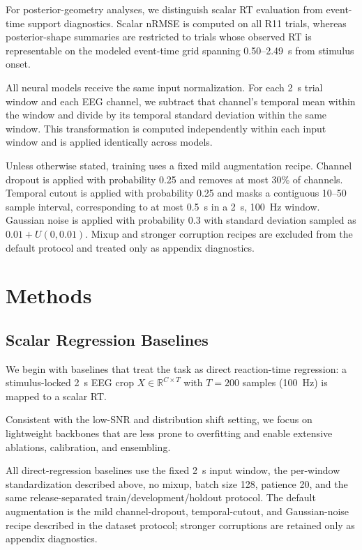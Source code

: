 \documentclass[12pt]{article}
\begin{document}
For posterior-geometry analyses, we distinguish scalar RT evaluation from event-time support diagnostics. Scalar nRMSE is computed on all R11 trials, whereas posterior-shape summaries are restricted to trials whose observed RT is representable on the modeled event-time grid spanning 0.50--2.49~s from stimulus onset.

All neural models receive the same input normalization. For each 2~s trial window and each EEG channel, we subtract that channel's temporal mean within the window and divide by its temporal standard deviation within the same window. This transformation is computed independently within each input window and is applied identically across models.

Unless otherwise stated, training uses a fixed mild augmentation recipe. Channel dropout is applied with probability 0.25 and removes at most 30\% of channels. Temporal cutout is applied with probability 0.25 and masks a contiguous 10--50 sample interval, corresponding to at most 0.5~s in a 2~s, 100~Hz window. Gaussian noise is applied with probability 0.3 with standard deviation sampled as $0.01 + U(0,0.01)$. Mixup and stronger corruption recipes are excluded from the default protocol and treated only as appendix diagnostics.

\section{Methods}

\subsection{Scalar Regression Baselines}

\label{sec:baseline_regression}

We begin with baselines that treat the task as direct reaction-time regression: a stimulus-locked 2~s EEG crop $X \in \mathbb{R}^{C \times T}$ with $T=200$ samples (100~Hz) is mapped to a scalar RT.

Consistent with the low-SNR and distribution shift setting, we focus on lightweight backbones that are less prone to overfitting and enable extensive ablations, calibration, and ensembling.

All direct-regression baselines use the fixed 2~s input window, the per-window standardization described above, no mixup, batch size 128, patience 20, and the same release-separated train/development/holdout protocol. The default augmentation is the mild channel-dropout, temporal-cutout, and Gaussian-noise recipe described in the dataset protocol; stronger corruptions are retained only as appendix diagnostics.
\end{document}
